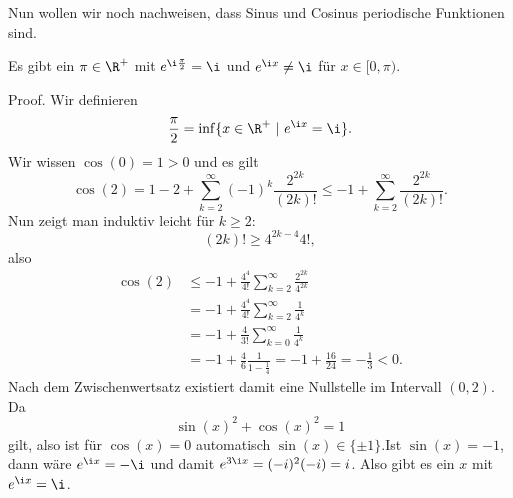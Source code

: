 \documentclass[letterpaper,10pt,english]{jupyterBook}
\begin{document}
Nun wollen wir noch nachweisen, dass Sinus  und Cosinus periodische Funktionen sind.
\label{stetigkeit/trig:lemma-0}
\begin{lemma}{}{}



Es gibt ein \(\pi \in \R^+\) mit \(e^{\i \frac{\pi}2} = \i\) und \(e^{\i x} \neq \i\) für \(x \in [0,\pi)\).
\end{lemma}

\begin{emphBox}{}{}
Proof.  Wir definieren
\begin{equation*}
 \frac{\pi}2 = \inf\{x \in \R^+~|~e^{\i x } = \i \}.
\end{equation*}
Wir wissen \(\cos(0)=1 > 0\) und es gilt
\begin{equation*}
 \cos(2)= 1 -2 + \sum_{k=2}^\infty (-1)^k \frac{2^{2k}}{(2k)!} \leq -1 + \sum_{k=2}^\infty  \frac{2^{2k}}{(2k)!} .
\end{equation*}
Nun zeigt man induktiv leicht für \(k \geq 2\):
\begin{equation*}
 (2k)! \geq 4^{2k-4} 4! ,
\end{equation*}
also
\begin{align*}
\cos(2) &\leq -1 + \frac{4^4}{4!} \sum_{k=2}^\infty \frac{2^{2k}}{4^{2k}} \\
&= -1   + \frac{4^4}{4!} \sum_{k=2}^\infty \frac{1}{4^{k}} \\
&= -1   + \frac{4 }{3!} \sum_{k=0}^\infty \frac{1}{4^{k}} \\
&= -1 + \frac{4}{6} \frac{1}{1-\frac{1}4} = -1 + \frac{16}{24}  = - \frac{1}{3} < 0.
\end{align*}
Nach dem Zwischenwertsatz existiert damit eine Nullstelle im Intervall \((0,2)\). Da
\begin{equation*}
 \sin(x)^2 + \cos(x)^2 = 1
\end{equation*}
gilt, also ist für \(\cos(x) = 0\) automatisch \(\sin(x) \in \{\pm 1\}\).Ist \(\sin(x) = -1\), dann wäre \(e^{\i x} = -\i\) und damit \(e^{3\i x} = (-i)^2(-i) = i\). Also gibt es ein \(x\) mit \(e^{\i x} =\i\).
\end{emphBox}
\end{document}
